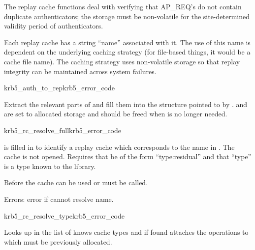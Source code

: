 The replay cache functions deal with verifying that AP_REQ's do not
contain duplicate authenticators; the storage must be non-volatile for
the site-determined validity period of authenticators.

Each replay cache has a string ``name'' associated with it.  The use of
this name is dependent on the underlying caching strategy (for
file-based things, it would be a cache file name).  The
caching strategy uses non-volatile storage so that replay
integrity can be maintained across system failures.

\begin{funcdecl}{krb5_auth_to_rep}{krb5_error_code}{\funcinout}
\funcin
{}
\funcout
{}
\end{funcdecl}
Extract the relevant parts of  and fill them into the
structure pointed to by .  
and  are set to allocated storage and
should be freed when  is no longer needed.

\begin{funcdecl}{krb5_rc_resolve_full}{krb5_error_code}{\funcinout}
\funcin
{}
\end{funcdecl}

\begin{sloppypar}
 is filled in to identify a replay cache which
corresponds to the name in .  The cache is not opened.
Requires that  be of the form ``type:residual''
and that ``type'' is a type known to the library.
\end{sloppypar}

Before the cache can be used  or
 must be called.

Errors: error if cannot resolve name.


\begin{funcdecl}{krb5_rc_resolve_type}{krb5_error_code}{\funcinout}
\funcin
{}
\end{funcdecl}

\internalfunc

Looks up  in the list of knows cache types and if found
attaches the operations to  which must be previously
allocated. 

